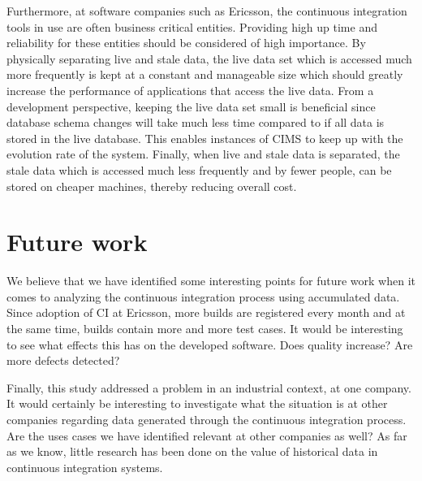 Furthermore, at software companies such as Ericsson, the continuous integration tools in use are often business critical entities. Providing high up time and reliability for these entities should be considered of high importance. By physically separating live and stale data, the live data set which is accessed much more frequently is kept at a constant and manageable size which should greatly increase the performance of applications that access the live data. From a development perspective, keeping the live data set small is beneficial since database schema changes will take much less time compared to if all data is stored in the live database. This enables instances of CIMS to keep up with the evolution rate of the system. Finally, when live and stale data is separated, the stale data which is accessed much less frequently and by fewer people, can be stored on cheaper machines, thereby reducing overall cost.


\section{Future work}
We believe that we have identified some interesting points for future work when it comes to analyzing the continuous integration process using accumulated data. Since adoption of CI at Ericsson, more builds are registered every month and at the same time, builds contain more and more test cases. It would be interesting to see what effects this has on the developed software. Does quality increase? Are more defects detected? 

Finally, this study addressed a problem in an industrial context, at one company. It would certainly be interesting to investigate what the situation is at other companies regarding data generated through the continuous integration process. Are the uses cases we have identified relevant at other companies as well? As far as we know, little research has been done on the value of historical data in continuous integration systems.

